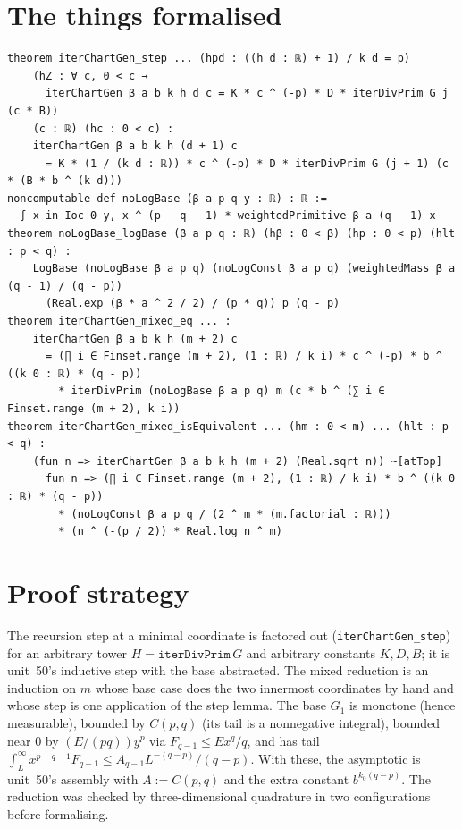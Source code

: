\documentclass[11pt]{article}
\begin{document}
\section{The things formalised}
{\small
\begin{verbatim}
theorem iterChartGen_step ... (hpd : ((h d : ℝ) + 1) / k d = p)
    (hZ : ∀ c, 0 < c →
      iterChartGen β a b k h d c = K * c ^ (-p) * D * iterDivPrim G j (c * B))
    (c : ℝ) (hc : 0 < c) :
    iterChartGen β a b k h (d + 1) c
      = K * (1 / (k d : ℝ)) * c ^ (-p) * D * iterDivPrim G (j + 1) (c * (B * b ^ (k d)))
noncomputable def noLogBase (β a p q y : ℝ) : ℝ :=
  ∫ x in Ioc 0 y, x ^ (p - q - 1) * weightedPrimitive β a (q - 1) x
theorem noLogBase_logBase (β a p q : ℝ) (hβ : 0 < β) (hp : 0 < p) (hlt : p < q) :
    LogBase (noLogBase β a p q) (noLogConst β a p q) (weightedMass β a (q - 1) / (q - p))
      (Real.exp (β * a ^ 2 / 2) / (p * q)) p (q - p)
theorem iterChartGen_mixed_eq ... :
    iterChartGen β a b k h (m + 2) c
      = (∏ i ∈ Finset.range (m + 2), (1 : ℝ) / k i) * c ^ (-p) * b ^ ((k 0 : ℝ) * (q - p))
        * iterDivPrim (noLogBase β a p q) m (c * b ^ (∑ i ∈ Finset.range (m + 2), k i))
theorem iterChartGen_mixed_isEquivalent ... (hm : 0 < m) ... (hlt : p < q) :
    (fun n => iterChartGen β a b k h (m + 2) (Real.sqrt n)) ~[atTop]
      fun n => (∏ i ∈ Finset.range (m + 2), (1 : ℝ) / k i) * b ^ ((k 0 : ℝ) * (q - p))
        * (noLogConst β a p q / (2 ^ m * (m.factorial : ℝ)))
        * (n ^ (-(p / 2)) * Real.log n ^ m)
\end{verbatim}
}

\section{Proof strategy}
The recursion step at a minimal coordinate is factored out (\texttt{iterChartGen\_step}) for an
arbitrary tower $H=\texttt{iterDivPrim}\,G$ and arbitrary constants $K,D,B$; it is unit~50's inductive
step with the base abstracted. The mixed reduction is an induction on $m$ whose base case does the
two innermost coordinates by hand and whose step is one application of the step lemma. The base
$G_1$ is monotone (hence measurable), bounded by $C(p,q)$ (its tail is a nonnegative integral),
bounded near $0$ by $(E/(pq))y^p$ via $F_{q-1}\le Ex^q/q$, and has tail
$\int_L^\infty x^{p-q-1}F_{q-1}\le A_{q-1}L^{-(q-p)}/(q-p)$. With these, the asymptotic is unit~50's
assembly with $A:=C(p,q)$ and the extra constant $b^{k_0(q-p)}$. The reduction was checked by
three-dimensional quadrature in two configurations before formalising.
\end{document}
